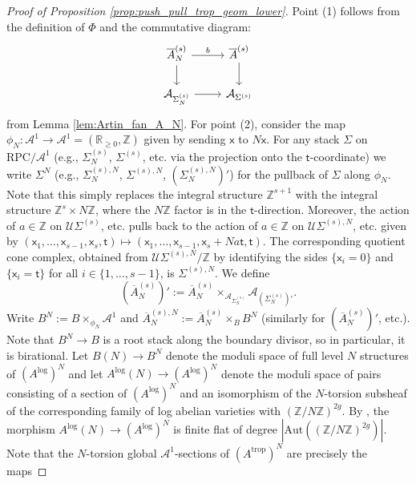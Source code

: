 \documentclass[11pt]{article}
\def\RPC{\mathrm{RPC}}
\def\Aut{\mathrm{Aut}}
\newcommand{\trop}{\mathrm{trop}}
\renewcommand{\log}{\mathrm{log}}
\newcommand{\barA}{\overline{A}}
\newcommand{\logA}{{A^{\log}}}
\newcommand{\tropA}{{A^{\trop}}}
\theoremstyle{definition}
\begin{document}
\begin{proof}[Proof of Proposition \ref{prop:push_pull_trop_geom_lower}]
	Point (1) follows from the definition of $\Phi$ and the commutative diagram:
	$$\begin{tikzcd}
		\barA_N^{(s)}\arrow[d]\arrow[r,"b"]&\barA^{(s)}\arrow[d]\\
		\mathcal{A}_{\Sigma_N^{(s)}}\arrow[r]&\mathcal{A}_{\Sigma^{(s)}}
	\end{tikzcd}$$
	from Lemma \ref{lem:Artin_fan_A_N}. For point (2), consider the map $\phi_N:\mathcal{A}^{1}\to \mathcal{A}^{1}=(\mathbb{R}_{\ge 0},\mathbb{Z})$
	given by sending $\mathsf{x}$ to $N\mathsf{x}$. For any stack $\Sigma$ on $\RPC/\mathcal{A}^{1}$ (e.g., $\Sigma_N^{(s)}$, $\Sigma^{(s)}$, etc.
	via the projection onto the $\mathsf{t}$-coordinate) we write $\Sigma^{N}$ (e.g., $\Sigma_N^{(s),N}$, $\Sigma^{(s),N}$, $(\Sigma_N^{(s),N})'$)
	for the pullback of $\Sigma$ along $\phi_N$. Note that this simply replaces the integral structure $\mathbb{Z}^{s+1}$ with the
	integral structure $\mathbb{Z}^{s}\times N\mathbb{Z}$, where the $N\mathbb{Z}$ factor is in the $\mathsf{t}$-direction.
	Moreover, the action of $a\in \mathbb{Z}$ on $\mathcal U\Sigma^{(s)}$, etc. pulls back to the action of $a\in \mathbb{Z}$ on $\mathcal U\Sigma^{(s),N}$, etc.
	given by $(\mathsf{x}_1,\dots,\mathsf{x}_{s-1},\mathsf{x}_s,\mathsf{t})\mapsto (\mathsf{x}_1,\dots,\mathsf{x}_{s-1},\mathsf{x}_s+Na\mathsf{t},\mathsf{t})$. The corresponding quotient cone
	complex, obtained from $\mathcal U\Sigma^{(s),N}/\mathbb{Z}$ by identifying the sides $\{\mathsf{x}_i=0\}$ and $\{\mathsf{x}_i=\mathsf{t}\}$ for all $i\in \{1,\dots,s-1\}$, is $\Sigma^{(s),N}$.
	We define
	$$(\barA_N^{(s)})':=\barA_N^{(s)}\times_{\mathcal{A}_{\Sigma_N^{(s)}}}\mathcal{A}_{(\Sigma_N^{(s)})'}.$$
	Write $B^{N}:=B\times_{\phi_N}\mathcal{A}^{1}$ and $\barA_N^{(s),N}:=\barA_N^{(s)}\times_{B}B^{N}$ (similarly for $(\barA_N^{(s)})'$, etc.).
	Note that $B^{N}\to B$ is a
	root stack along the boundary divisor, so in particular, it is birational. Let $B(N)\to B^{N}$ denote the moduli space of full level $N$ structures of $(\logA)^{N}$ and let $\logA(N)\to (\logA)^{N}$ denote the moduli space of
	pairs consisting of a section of $(\logA)^{N}$ and an isomorphism of the $N$-torsion subsheaf of the corresponding family of log abelian varieties
	with $(\mathbb{Z}/N\mathbb{Z})^{2g}$. By \cite[Proposition 18.1]{KKN4},
	the morphism $\logA(N)\to (\logA)^{N}$ is finite flat of degree $|\Aut((\mathbb{Z}/N\mathbb{Z})^{2g})|$.
	Note that the $N$-torsion global $\mathcal{A}^{1}$-sections of $(\tropA)^{N}$ are precisely the maps

\end{proof}
\end{document}
